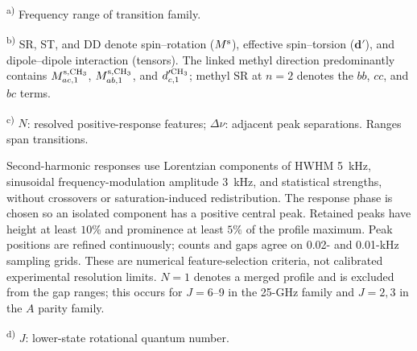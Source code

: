 \begin{table}[!tp]
\begin{minipage}{\linewidth}
\footnotesize\raggedright
\textsuperscript{a)} Frequency range of transition family. \par
\textsuperscript{b)} SR, ST, and DD denote spin--rotation ($M^{\rm s}$), effective
    spin--torsion ($\bm d'$), and dipole--dipole interaction (tensors).
The linked methyl direction predominantly contains
$M^{{\rm s},{\rm CH_3}}_{ac,1}$, $M^{{\rm s},{\rm CH_3}}_{ab,1}$,
and $d^{\prime\rm CH_3}_{c,1}$; methyl SR at $n=2$ denotes the
$bb$, $cc$, and $bc$ terms.\par
\textsuperscript{c)} $N$: resolved positive-response features; $\Delta\nu$: adjacent peak separations. Ranges span transitions.\par
Second-harmonic responses use Lorentzian components of HWHM
5~kHz, sinusoidal frequency-modulation amplitude 3~kHz, and statistical
strengths, without crossovers or saturation-induced redistribution.
The response phase is chosen so an isolated component has a positive
central peak. Retained peaks have height at least $10\%$ and prominence at
least $5\%$ of the profile maximum. Peak positions are refined continuously;
counts and gaps agree on 0.02- and 0.01-kHz sampling grids. These are numerical
feature-selection criteria, not calibrated experimental resolution limits.
$N=1$ denotes a merged profile and is excluded from the gap ranges;
this occurs for $J=6$--9 in the 25-GHz family and $J=2,3$ in the
$A$ parity family.\par
\textsuperscript{d)} $J$: lower-state rotational quantum number.
\end{minipage}
\end{table}
